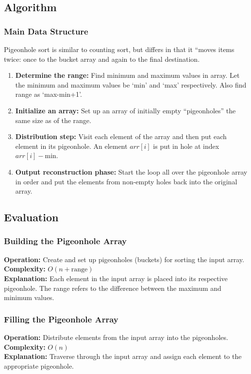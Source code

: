 \subsection{Algorithm}

\subsubsection{Main Data Structure}
Pigeonhole sort is similar to counting sort, but differs in that it “moves items twice: once to the bucket array and again to the final destination.

\begin{enumerate}
    \item \textbf{Determine the range:} Find minimum and maximum values in array. Let the minimum and maximum values be ‘min’ and ‘max’ respectively. Also find range as ‘max-min+1’.
    \item \textbf{Initialize an array:} Set up an array of initially empty “pigeonholes” the same size as of the range.
    \item \textbf{Distribution step:} Visit each element of the array and then put each element in its pigeonhole. An element $arr[i]$ is put in hole at index $arr[i] - \text{min}$.
    \item \textbf{Output reconstruction phase:} Start the loop all over the pigeonhole array in order and put the elements from non-empty holes back into the original array.
\end{enumerate}



\subsection{Evaluation}

\subsubsection{Building the Pigeonhole Array}
\textbf{Operation:} Create and set up pigeonholes (buckets) for sorting the input array. \\
\textbf{Complexity:} \(O(n + \text{range})\) \\
\textbf{Explanation:} Each element in the input array is placed into its respective pigeonhole. The range refers to the difference between the maximum and minimum values.

\subsubsection{Filling the Pigeonhole Array}
\textbf{Operation:} Distribute elements from the input array into the pigeonholes. \\
\textbf{Complexity:} \(O(n)\) \\
\textbf{Explanation:} Traverse through the input array and assign each element to the appropriate pigeonhole.

